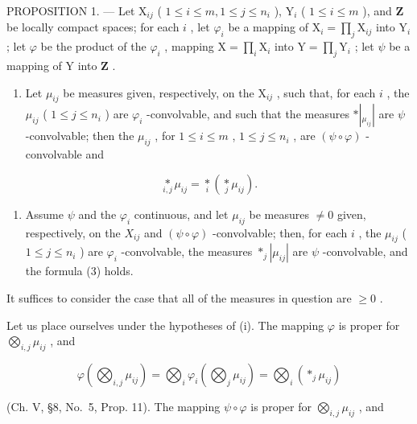 PROPOSITION 1. --- Let \(\mathrm{X}_{ij}\) ( \(1 \leqslant i \leqslant m, 1 \leqslant j \leqslant n_i\) ), \(\mathrm{Y}_i\) ( \(1 \leqslant i \leqslant m\) ), and \(\mathbf{Z}\) be locally compact spaces; for each \(i\) , let \(\varphi_i\) be a mapping of \(\mathrm{X}_i = \prod_j \mathrm{X}_{ij}\) into \(\mathrm{Y}_i\) ; let \(\varphi\) be the product of the \(\varphi_i\) , mapping \(\mathrm{X} = \prod_i \mathrm{X}_i\) into \(\mathrm{Y} = \prod_j \mathrm{Y}_i\) ; let \(\psi\) be a mapping of \(\mathrm{Y}\) into \(\mathbf{Z}\) .

\begin{enumerate}
\def\labelenumi{(\roman{enumi})}
\tightlist
\item
  Let \(\mu_{ij}\) be measures given, respectively, on the \(\mathrm{X}_{ij}\) , such that, for each \(i\) , the \(\mu_{ij}\) ( \(1 \leqslant j \leqslant n_i\) ) are \(\varphi_i\) -convolvable, and such that the measures \(*|_{\mu_{ij}}|\) are \(\psi\) -convolvable; then the \(\mu_{ij}\) , for \(1 \leqslant i \leqslant m\) , \(1 \leqslant j \leqslant n_i\) , are \((\psi \circ \varphi)\) -convolvable and
\end{enumerate}

\[
\underset {i, j} {\ast} \mu_ {i j} = \underset {i} {\ast} \left(\underset {j} {\ast} \mu_ {i j}\right).\tag{3}
\]

\begin{enumerate}
\def\labelenumi{(\roman{enumi})}
\setcounter{enumi}{1}
\tightlist
\item
  Assume \(\psi\) and the \(\varphi_{i}\) continuous, and let \(\mu_{ij}\) be measures \(\neq 0\) given, respectively, on the \(X_{ij}\) and \((\psi \circ \varphi)\) -convolvable; then, for each \(i\) , the \(\mu_{ij}\) ( \(1 \leqslant j \leqslant n_{i}\) ) are \(\varphi_{i}\) -convolvable, the measures \(*_{j} |\mu_{ij}|\) are \(\psi\) -convolvable, and the formula (3) holds.
\end{enumerate}

It suffices to consider the case that all of the measures in question are \(\geqslant 0\) .

Let us place ourselves under the hypotheses of (i). The mapping \(\varphi\) is proper for \(\bigotimes_{i,j} \mu_{ij}\) , and

\[
\varphi \left(\bigotimes_ {i, j} \mu_ {i j}\right) = \bigotimes_ {i} \varphi_ {i} \left(\bigotimes_ {j} \mu_ {i j}\right) = \bigotimes_ {i} \left(* _ {j} \mu_ {i j}\right)
\]

(Ch. V, §8, No.~5, Prop. 11). The mapping \(\psi \circ \varphi\) is proper for \(\bigotimes_{i,j} \mu_{ij}\) , and

